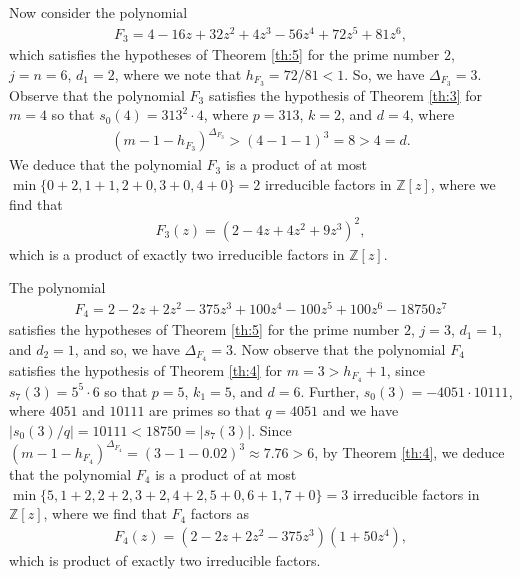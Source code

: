 \documentclass[12pt]{amsart}%
\begin{document}
\begin{example}
Now consider the polynomial
\begin{eqnarray*}
F_3=4-16z+32z^2+4z^3-56z^4+72z^5+81z^6,
\end{eqnarray*}
which satisfies the hypotheses of Theorem \ref{th:5} for the prime number $2$, $j=n=6$, $d_1=2$, where we note that  $h_{F_3}=72/81<1$. So, we have $\Delta_{F_3}=3$. Observe that the polynomial $F_3$ satisfies the hypothesis of Theorem \ref{th:3} for  		
$m=4$ so that $s_0(4)=313^2\cdot4$, where $p=313$, $k=2$, and $d=4$, where
\begin{eqnarray*}
(m-1-h_{F_3})^{\Delta_{F_3}}>(4-1-1)^3=8>4=d.
\end{eqnarray*}
We deduce that the polynomial $F_3$ is a product of at most $\min\{0+2,1+1,2+0,3+0,4+0\}=2$ irreducible factors in $\mathbb{Z}[z]$, where we find that
		\begin{eqnarray*}
			F_3(z)=(2-4z+4z^2+9z^3)^2,
		\end{eqnarray*}
which is a product of exactly two irreducible factors in $\mathbb{Z}[z]$.
	\end{example}
\begin{example}The polynomial
\begin{eqnarray*}
F_4=2-2z+2z^2-375z^3+100z^4-100z^5+100z^6-18750z^7
\end{eqnarray*}
satisfies the hypotheses of Theorem \ref{th:5} for the prime number $2$, $j=3$, $d_1=1$, and $d_2=1$, and so, we have $\Delta_{F_4}=3$. Now observe that the polynomial $F_4$ satisfies the hypothesis of Theorem \ref{th:4} for $m=3>h_{F_4}+1$, since $s_7(3)=5^5\cdot 6$ so that $p=5$, $k_1=5$, and $d=6$. Further, $s_0(3)=-4051\cdot 10111$, where $4051$ and $10111$ are primes so that $q=4051$ and we have  $|s_0(3)/q| =10111<18750=|s_7(3)|$. Since $(m-1-h_{F_4})^{\Delta_{F_4}}=(3-1-0.02)^3\approx 7.76>6$, by Theorem \ref{th:4}, we deduce that the polynomial $F_4$ is a product of at most $\min\{5,1+2,2+2,3+2,4+2,5+0,6+1,7+0\}=3$ irreducible factors in $\mathbb{Z}[z]$, where we find that $F_4$ factors as
	\begin{eqnarray*}
		F_4(z)=(2-2z+2z^2-375z^3)(1+50z^4),
	\end{eqnarray*}
which is product of exactly two irreducible factors.
	\end{example}
\end{document}
